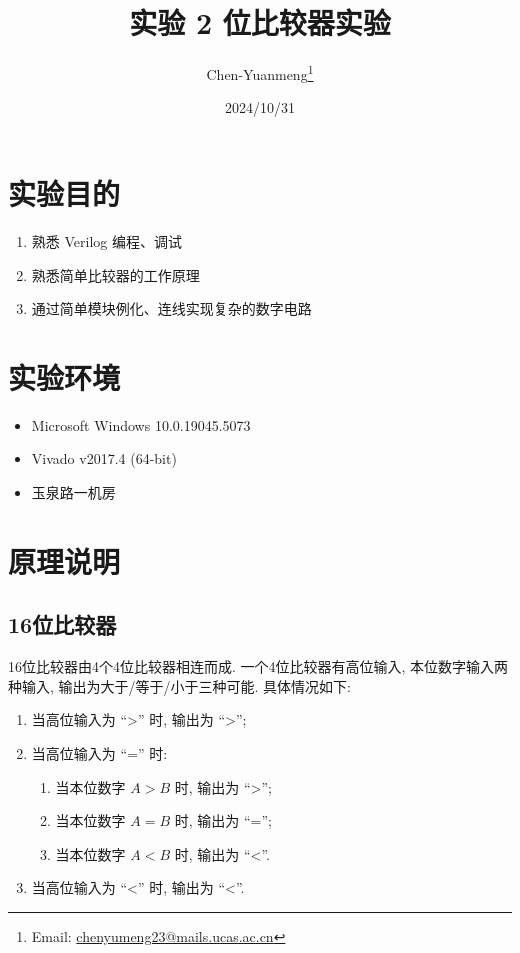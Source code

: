 \documentclass{article}
\title{实验 2 \quad 16 位比较器实验}
\author{Chen-Yuanmeng\thanks{Email: \url{chenyumeng23@mails.ucas.ac.cn}}}
\date{2024/10/31}
\providecommand{\tightlist}{\setlength{\itemsep}{0pt}\setlength{\parskip}{0pt}}
\begin{document}
\maketitle

\section{实验目的}

\begin{enumerate}\tightlist
    \item 熟悉 Verilog 编程、调试
    \item 熟悉简单比较器的工作原理
    \item 通过简单模块例化、连线实现复杂的数字电路
\end{enumerate}

\section{实验环境}

\begin{itemize}\tightlist
    \item Microsoft Windows 10.0.19045.5073
    \item Vivado v2017.4 (64-bit)
    \item 玉泉路一机房
\end{itemize}

\section{原理说明}

\subsection{16位比较器}

16位比较器由4个4位比较器相连而成. 一个4位比较器有高位输入, 本位数字输入两种输入, 输出为大于/等于/小于三种可能. 具体情况如下:
\begin{enumerate}\tightlist
    \item 当高位输入为 ``>'' 时, 输出为 ``>'';
    \item 当高位输入为 ``='' 时: \begin{enumerate}\tightlist
        \item 当本位数字 \(A > B\) 时, 输出为 ``>'';
        \item 当本位数字 \(A = B\) 时, 输出为 ``='';
        \item 当本位数字 \(A < B\) 时, 输出为 ``<''.
    \end{enumerate}
    \item 当高位输入为 ``<'' 时, 输出为 ``<''.
\end{enumerate}
\end{document}
